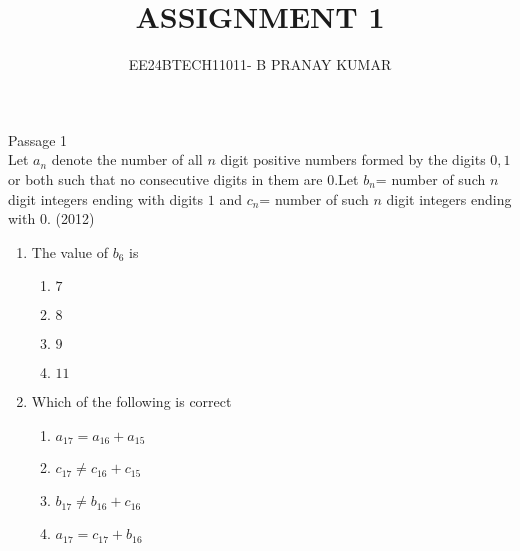 \documentclass[journal,12pt,twocolumn]{IEEEtran}
\theoremstyle{remark}
\begin{document}



\title{ASSIGNMENT 1}
\author{EE24BTECH11011- B PRANAY KUMAR}
\maketitle
\newpage
\bigskip

\renewcommand{\thefigure}{\theenumi}
\renewcommand{\thetable}{\theenumi}
   Passage 1\\
Let $a_n$ denote the number of all $n$ digit positive numbers formed by the digits $0,1$ or both such that no consecutive digits in them are $0$.Let $b_n$= number of such $n$ digit integers ending with digits $1$ and $c_n$= number of such $n$ digit integers ending with $0$.
\hfill (2012)
\begin{enumerate}
    \item The value of $b_6$ is
    \begin{enumerate}
        \item $7$ 
        \item $8$
        \item $9$
        \item $11$
    \end{enumerate}
    \item Which of the following is correct
    \begin{enumerate}
        \item $a_{17}=a_{16}+a_{15}$     
        \item $c_{17}\neq c_{16}+c_{15}$
        \item $b_{17} \neq b_{16}+c_{16}$
        \item $a_{17}=c_{17}+b_{16}$  \\[30pt]
    \end{enumerate}
\end{enumerate}

    
\end{document}
